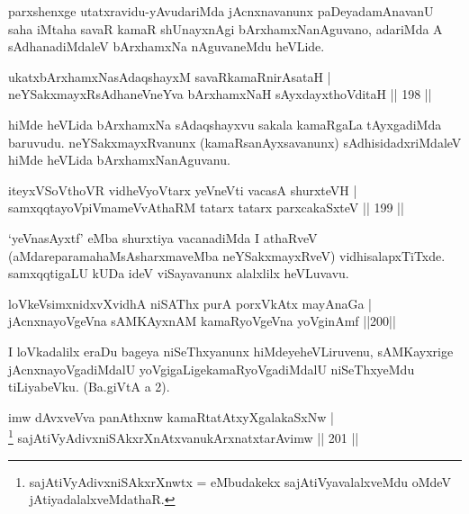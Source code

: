 \begin{artha}
parxshenxge utatxravidu-yAvudariMda jAcnxnavanunx paDeyada\break mAnavanU saha iMtaha savaR kamaR shUnayxnAgi bArxhamxNanAguvano, adariMda A sAdhanadiMdaleV bArxhamxNa nAguvaneMdu heVLide.
\end{artha}

\begin{shl}
ukatxbArxhamxNasAdaqshayxM savaRkamaRnirAsataH |\\
neYSakxmayxRsAdhaneVneYva bArxhamxNaH sAyxdayxthoVditaH \hfill || 198 ||
\end{shl}

\begin{artha}
hiMde heVLida bArxhamxNa sAdaqshayxvu sakala kamaRgaLa tAyxgadiMda baruvudu. neYSakxmayxRvanunx (kamaRsanAyxsavanunx) sAdhisidadxriMdaleV hiMde heVLida bArxhamxNanAguvanu.
\end{artha}

\begin{shl}
iteyxVSoV\s thoVR vidheVyoV\s tarx yeVneVti vacasA shurxteVH |\\
samxqqtayoV\s piVmameVvAthaRM tatarx tatarx parxcakaSxteV \hfill || 199 ||
\end{shl}

\begin{artha}
`yeVnasAyxtf' eMba shurxtiya vacanadiMda I athaRveV (aMdare\break paramahaMsAsharxmaveMba neYSakxmayxRveV) vidhisalapxTiTxde. samxqqtigaLU kUDa ideV viSayavanunx alalxlilx heVLuvavu.
\end{artha}%


\begin{shl}
loVkeV\s simxnidxvXvidhA niSAThx purA porxVkAtx mayA\s naGa |\\
jAcnxnayoVgeVna sAMKAyxnAM kamaRyoVgeVna yoVginAmf \hfill ||200||
\end{shl}

\begin{artha}
I loVkadalilx eraDu bageya niSeThxyanunx hiMdeye\break heVLiruvenu, sAMKayxrige jAcnxnayoVgadiMdalU yoVgigaLige\break kamaRyoVgadiMdalU niSeThxyeMdu tiLiyabeVku. (Ba.giVtA a 2).
\end{artha}



\begin{shl}
imw dAvxveVva panAthxnw kamaRtatAtxyXgalakaSxNw |\\
\footnote{sajAtiVyAdivxniSAkxrXnwtx = eMbudakekx sajAtiVyavalalxveMdu oMdeV jAtiyadalalxveMdathaR.} sajAtiVyAdivxniSAkxrXnAtxvanukArxnatxtarAvimw \hfill || 201 ||
\end{shl}


